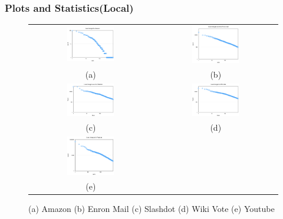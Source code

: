 \subsubsection{Plots and Statistics(Local)}
\begin{figure}[h]
\begin{center}
\begin{tabular}{cc}
     \includegraphics[width=0.4\textwidth]{FIG/t7_amazon.png} &
     \includegraphics[width=0.4\textwidth]{FIG/t7_enron.png} \\
     (a) & (b) \\
     \includegraphics[width=0.4\textwidth]{FIG/t7_slashdot.png} &
     \includegraphics[width=0.4\textwidth]{FIG/t7_wikivote.png} \\
     (c) & (d) \\
     \includegraphics[width=0.4\textwidth]{FIG/t7_youtube.png} & \\
     (e)
\end{tabular}
\caption{(a) Amazon (b) Enron Mail (c) Slashdot (d) Wiki Vote (e) Youtube}
\label{t7:1}
\end{center}
\end{figure}